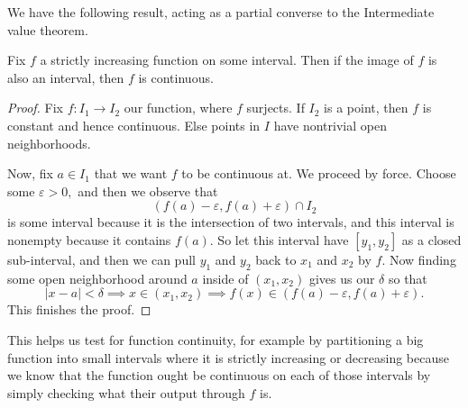 We have the following result, acting as a partial converse to the Intermediate value theorem.
\begin{proposition}
	Fix $f$ a strictly increasing function on some interval. Then if the image of $f$ is also an interval, then $f$ is continuous.
\end{proposition}
\begin{proof}
	Fix $f:I_1\to I_2$ our function, where $f$ surjects. If $I_2$ is a point, then $f$ is constant and hence continuous. Else points in $I$ have nontrivial open neighborhoods.
	
	Now, fix $a\in I_1$ that we want $f$ to be continuous at. We proceed by force. Choose some $\varepsilon>0,$ and then we observe that
	\[(f(a)-\varepsilon,f(a)+\varepsilon)\cap I_2\]
	is some interval because it is the intersection of two intervals, and this interval is nonempty because it contains $f(a).$ So let this interval have $[y_1,y_2]$ as a closed sub-interval, and then we can pull $y_1$ and $y_2$ back to $x_1$ and $x_2$ by $f.$ Now finding some open neighborhood around $a$ inside of $(x_1,x_2)$ gives us our $\delta$ so that
	\[|x-a|<\delta\implies x\in(x_1,x_2)\implies f(x)\in(f(a)-\varepsilon,f(a)+\varepsilon).\]
	This finishes the proof.
\end{proof}
This helps us test for function continuity, for example by partitioning a big function into small intervals where it is strictly increasing or decreasing because we know that the function ought be continuous on each of those intervals by simply checking what their output through $f$ is.